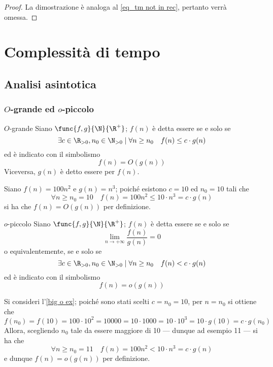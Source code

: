 \documentclass[a4paper, 12pt]{report}
\begin{document}
    \begin{proof}
        La dimostrazione è analoga al \cref{eq_tm not in rec}, pertanto verrà omessa.
    \end{proof}

    \chapter{Complessità di tempo}

    \section{Analisi asintotica}
    
    \subsection{$O$-grande ed $o$-piccolo}

    \begin{frameddefn}{$O$-grande}
        Siano $\func{f, g}{\N}{\R^+}$; $f(n)$ è detta essere  se e solo se $$\exists c \in \R_{>0}, n_0 \in \N_{>0} \mid \forall n \ge n_0 \quad f(n) \leq c \cdot g(n)$$ ed è indicato con il simbolismo $$f(n) = O(g(n))$$ Viceversa, $g(n)$ è detto essere  per $f(n)$.
    \end{frameddefn}

    \begin{example}[$O$-grande]
        \label{big o ex}
        Siano $f(n) = 100 n^2$ e $g(n) = n^3$; poiché esistono $c = 10$ ed $n_0 = 10$ tali che $$\forall n \ge n_0 = 10 \quad f(n) = 100 n^2 \leq 10 \cdot n^3 = c \cdot g(n)$$ si ha che $f(n) = O(g(n))$ per definizione.
    \end{example}

    \begin{frameddefn}{$o$-piccolo}
        Siano $\func{f, g}{\N}{\R^+}$; $f(n)$ è detta essere  se e solo se $$\lim_{n \to + \infty}{\dfrac{f(n)}{g(n)}} = 0$$ o equivalentemente, se e solo se $$\exists c \in \R_{> 0}, n_0 \in \N_{>0} \mid \forall n \ge n_0 \quad f(n) < c \cdot g(n)$$ ed è indicato con il simbolismo $$f(n) = o(g(n))$$
    \end{frameddefn}

    \begin{example}[$o$-piccolo]
        Si consideri l'\cref{big o ex}; poiché sono stati scelti $c = n_0 = 10$, per $n = n_0$ si ottiene che $$f(n_0) = f(10) = 100 \cdot 10^2 = 10000 = 10 \cdot 1000 = 10 \cdot 10^3 = 10 \cdot g(10) = c \cdot g(n_0)$$ Allora, scegliendo $n_0$ tale da essere maggiore di 10 --- dunque ad esempio 11 --- si ha che $$\forall n \ge n_0 = 11 \quad f(n) = 100 n^2 < 10 \cdot n^3 = c \cdot g(n)$$ e dunque $f(n) = o(g(n))$ per definizione.
    \end{example}
\end{document}
